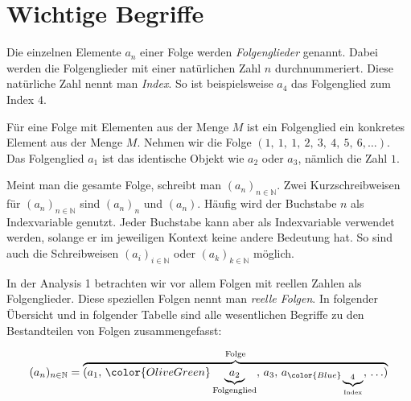 \documentclass[fontsize=9pt,
               parskip=half-,
               DIV=14,
               listof=chapterentry,
               tocflat]{scrbook}
\begin{document}
\section{Wichtige Begriffe}

Die einzelnen Elemente $a_{n}$ einer Folge werden \emph{Folgenglieder} genannt. Dabei werden die Folgenglieder mit einer natürlichen Zahl $n$ durchnummeriert. Diese natürliche Zahl nennt man \emph{Index}. So ist beispielsweise $a_{4}$ das Folgenglied zum Index $4$.

Für eine Folge mit Elementen aus der Menge $M$ ist ein Folgenglied ein konkretes Element aus der Menge $M$. Nehmen wir die Folge $(1,\ 1,\ 1,\ 2,\ 3,\ 4,\ 5,\ 6,\ldots )$. Das Folgenglied $a_{1}$ ist das identische Objekt wie $a_{2}$ oder $a_{3}$, nämlich die Zahl $1$.

Meint man die gesamte Folge, schreibt man $\left(a_{n}\right)_{n\in \mathbb {N} }$. Zwei Kurzschreibweisen für $\left(a_{n}\right)_{n\in \mathbb {N} }$ sind $(a_{n})_{n}$ und $(a_{n})$. Häufig wird der Buchstabe $n$ als Indexvariable genutzt. Jeder Buchstabe kann aber als Indexvariable verwendet werden, solange er im jeweiligen Kontext keine andere Bedeutung hat. So sind auch die Schreibweisen $\left(a_{i}\right)_{i\in \mathbb {N} }$ oder $\left(a_{k}\right)_{k\in \mathbb {N} }$ möglich.

In der Analysis 1 betrachten wir vor allem Folgen mit reellen Zahlen als Folgenglieder. Diese speziellen Folgen nennt man \emph{reelle Folgen}. In folgender Übersicht und in folgender Tabelle sind alle wesentlichen Begriffe zu den Bestandteilen von Folgen zusammengefasst:

\begin{align*}
(a_{n})_{n\in \mathbb {N} }=\overbrace {(a_{1},\,{\color {OliveGreen}\underbrace {a_{2}} _{\text{Folgenglied}}},\,a_{3},\,a_{\color {Blue}\underbrace {{}_{4}} _{\text{Index}}},\,\ldots )} ^{\text{Folge}}
\end{align*}


\renewcommand{\arraystretch}{1.5}
\end{document}
